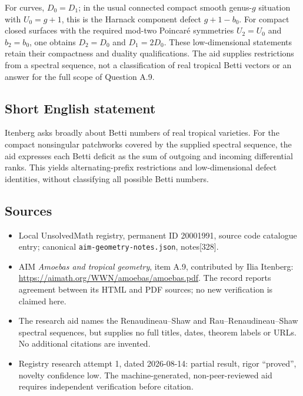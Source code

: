 \documentclass[11pt]{article}
\begin{document}
For curves, $D_0=D_1$; in the usual connected compact smooth genus-$g$ situation with $U_0=g+1$, this is the Harnack component defect $g+1-b_0$. For compact closed surfaces with the required mod-two Poincar\'e symmetries $U_2=U_0$ and $b_2=b_0$, one obtains $D_2=D_0$ and $D_1=2D_0$. These low-dimensional statements retain their compactness and duality qualifications. The aid supplies restrictions from a spectral sequence, not a classification of real tropical Betti vectors or an answer for the full scope of Question A.9.
\subsection{Short English statement}
Itenberg asks broadly about Betti numbers of real tropical varieties. For the compact nonsingular patchworks covered by the supplied spectral sequence, the aid expresses each Betti deficit as the sum of outgoing and incoming differential ranks. This yields alternating-prefix restrictions and low-dimensional defect identities, without classifying all possible Betti numbers.
\subsection{Sources}
\begin{itemize}
\item Local UnsolvedMath registry, permanent ID 20001991, source code catalogue entry; canonical \texttt{aim-geometry-notes.json}, notes[328].
\item AIM \emph{Amoebas and tropical geometry}, item A.9, contributed by Ilia Itenberg: \url{https://aimath.org/WWN/amoebas/amoebas.pdf}. The record reports agreement between its HTML and PDF sources; no new verification is claimed here.
\item The research aid names the Renaudineau--Shaw and Rau--Renaudineau--Shaw spectral sequences, but supplies no full titles, dates, theorem labels or URLs. No additional citations are invented.
\item Registry research attempt 1, dated 2026-08-14: partial result, rigor ``proved'', novelty confidence low. The machine-generated, non-peer-reviewed aid requires independent verification before citation.
\end{itemize}
\end{document}

